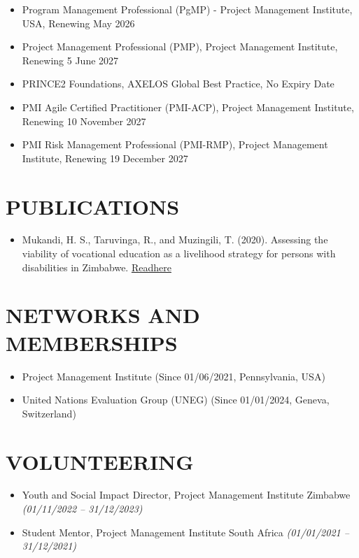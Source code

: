 \documentclass[
  10pt,
]{article}
\providecommand{\tightlist}{%
  \setlength{\itemsep}{0pt}\setlength{\parskip}{0pt}}
\begin{document}
\begin{itemize}[itemsep=0.25em, topsep=0.25em]
  \item Program Management Professional (PgMP) - Project Management Institute, USA, Renewing May 2026  
  \item Project Management Professional (PMP), Project Management Institute, Renewing 5 June 2027  
  \item PRINCE2 Foundations, AXELOS Global Best Practice, No Expiry Date  
  \item PMI Agile Certified Practitioner (PMI-ACP), Project Management Institute, Renewing 10 November 2027  
  \item PMI Risk Management Professional (PMI-RMP), Project Management Institute, Renewing 19 December 2027
\end{itemize}

\section{PUBLICATIONS}\label{publications}

\begin{itemize}
\tightlist
\item
  Mukandi, H. S., Taruvinga, R., and Muzingili, T. (2020). Assessing the
  viability of vocational education as a livelihood strategy for persons
  with disabilities in Zimbabwe.
  \href{https://catalogue.leidenuniv.nl/permalink/31UKB_LEU/s5ab2f/alma9939992501102711}{Readhere}
\end{itemize}

\section{NETWORKS AND MEMBERSHIPS}\label{networks-and-memberships}

\begin{itemize}[itemsep=0.25em, topsep=0.25em]
  \item Project Management Institute (Since 01/06/2021, Pennsylvania, USA)  
  \item United Nations Evaluation Group (UNEG) (Since 01/01/2024, Geneva, Switzerland)
\end{itemize}

\section{VOLUNTEERING}\label{volunteering}

\begin{itemize}[itemsep=0.25em, topsep=0.25em]
  \item Youth and Social Impact Director, Project Management Institute Zimbabwe \textit{(01/11/2022 – 31/12/2023)}
  \item Student Mentor, Project Management Institute South Africa \textit{(01/01/2021 – 31/12/2021)}
\end{itemize}
\end{document}
